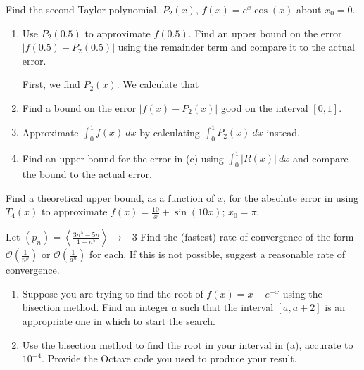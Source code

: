 \documentclass{article}
\theoremstyle{plain} %
\numberwithin{thm}{section} %
\theoremstyle{definition}
\begin{document}
    \begin{question}{3}
        Find the second Taylor polynomial, \(P_2(x)\), \(f(x) = e^x \cos (x)\) about \(x_0 = 0\).
        \begin{enumerate}[label=(\alph*)]
            \item Use \(P_2(0.5)\) to approximate \(f(0.5)\). Find an upper bound on the error \(|f(0.5) - P_2(0.5)|\) using the remainder term and compare it to the actual error.
            
            First, we find \(P_2(x)\). We calculate that
            

            \item Find a bound on the error \(|f(x) - P_2(x)|\) good on the interval \([0,1]\).
            \item Approximate \(\int _0^1 f(x)\ dx\) by calculating \(\int _0^1 P_2(x)\ dx\) instead.
            \item Find an upper bound for the error in (c) using \(\int _0^1 |R(x)|\ dx\) and compare the bound to the actual error.
        \end{enumerate}
    \end{question}
    \newpage
    \begin{question}{4}
        Find a theoretical upper bound, as a function of \(x\), for the absolute error in using \(T_4(x)\) to approximate \(f(x) = \frac{10}{x} + \sin(10x)\); \(x_0 = \pi\).
    \end{question}
    \newpage
    \begin{question}{5}
        Let \((p_n) = \left\langle \frac{3n^5 - 5n}{1 - n^5} \right\rangle \to -3\) Find the (fastest) rate of convergence of the form \(\mathcal{O}\left(\frac{1}{n^p}\right)\) or \(\mathcal{O}\left(\frac{1}{a^n}\right)\) for each. If this is not possible, suggest a reasonable rate of convergence.
    \end{question}
    \newpage
    \begin{question}{6}
        \begin{enumerate}[label=(\alph*)]
            \item Suppose you are trying to find the root of \(f(x) = x - e^{-x}\) using the bisection method. Find an integer \(a\) such that the interval \([a, a+2]\) is an appropriate one in which to start the search.
            \item Use the bisection method to find the root in your interval in (a), accurate to \(10^{-4}\). Provide the Octave code you used to produce your result.
        \end{enumerate}
    \end{question}
\end{document}
